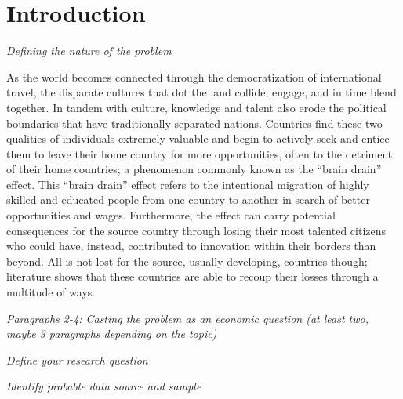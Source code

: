 \documentclass[12pt]{article}
\newcommand{\pointer}[1]{{\color{red} \center \textit{#1}}}
\begin{document}
\section{Introduction}

\pointer{Defining the nature of the problem}

As the world becomes connected through the democratization of international travel, the disparate cultures that dot the land collide, engage, and in time blend together.
In tandem with culture, knowledge and talent also erode the political boundaries that have traditionally separated nations.
Countries find these two qualities of individuals extremely valuable and begin to actively seek and entice them to leave their home country for more opportunities, often to the detriment of their home countries; a phenomenon commonly known as the ``brain drain'' effect.
This ``brain drain'' effect refers to the intentional migration of highly skilled and educated people from one country to another in search of better opportunities and wages. 
Furthermore, the effect can carry potential consequences for the source country through losing their most talented citizens who could have, instead, contributed to innovation within their borders than beyond.
All is not lost for the source, usually developing, countries though; literature shows that these countries are able to recoup their losses through a multitude of ways.



\pointer{Paragraphs 2-4: Casting the problem as an economic question (at least two, maybe 3 paragraphs depending on the topic)}

\pointer{Define your research question}

\pointer{Identify probable data source and sample}
\end{document}
